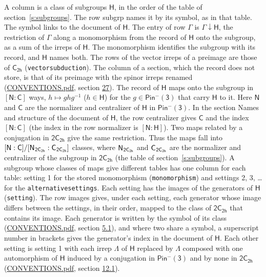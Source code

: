 \documentclass[10pt,a4paper]{article}
\numberwithin{equation}{section}
\newcommand{\grp}[1]{\mathsf{#1}}
\newcommand{\grpindex}[2]{[#1 : #2]}
\newcommand{\restr}[2]{#1\!\downarrow#2}
\newcommand{\hairsp}{\mkern1mu}
\begin{document}
A column is a class of subgroups $\grp{H}$, in the order of the table of section~\ref{s:subgroups}. The row subgrp names it by its symbol, as in that table. The symbol links to the document of $\grp{H}$. The entry of row $\Gamma$ is $\restr{\Gamma}{\grp{H}}$, the restriction of $\Gamma$ along a monomorphism from the record of $\grp{H}$ onto the subgroup, as a sum of the irreps of $\grp{H}$. The monomorphism identifies the subgroup with its record, and $\grp{H}$ names both. The rows of the vector irreps of a preimage are those of \href{../../../rotation/data/pdf/C2h.pdf}{$\grp{C_{2h}}$} (\texttt{vectorsubduction}). The column of a section, which the record does not store, is that of its preimage with the spinor irreps renamed (\href{../../CONVENTIONS.pdf}{CONVENTIONS.pdf}, section \href{../../CONVENTIONS.pdf\#conv.27}{27}). \label{n:group.normalizer.o3}\label{n:group.centralizer.o3}\label{n:element.h}The record of $\grp{H}$ maps onto the subgroup in $\grpindex{\grp{N}}{\grp{C}}$ ways, $h \mapsto g h g^{-1}$ ($h \in \grp{H}$) for the $g \in \grp{Pin^{-}(3)}$ that carry $\grp{H}$ to it. Here $\grp{N}$ and $\grp{C}$ are the normalizer and centralizer of $\grp{H}$ in \href{Pinminus3.pdf}{$\grp{Pin^{-}(3)}$}. In the section Names and structure of the document of $\grp{H}$, the row centralizer gives $\grp{C}$ and the index $\grpindex{\grp{N}}{\grp{C}}$ (the index in the row normalizer is $\grpindex{\grp{N}}{\grp{H}}$). Two maps related by a conjugation in $\grp{2C_{2h}}$ give the same restriction. Thus the maps fall into $\grpindex{\grp{N}}{\grp{C}}/\grpindex{\grp{N}_{\hairsp \grp{2C_{2h}}}}{\grp{C}_{\hairsp \grp{2C_{2h}}}}$ classes, where $\grp{N}_{\hairsp \grp{2C_{2h}}}$ and $\grp{C}_{\hairsp \grp{2C_{2h}}}$ are the normalizer and centralizer of the subgroup in $\grp{2C_{2h}}$ (the table of section~\ref{s:subgroups}). \label{n:head.setting}A subgroup whose classes of maps give different tables has one column for each table: setting 1 for the stored monomorphism (\texttt{monomorphism}) and settings 2, 3, \dots{} for the \texttt{alternativesettings}. Each setting has the images of the generators of $\grp{H}$ (\texttt{setting}). \label{n:head.images}The row images gives, under each setting, each generator whose image differs between the settings, in their order, mapped to the class of $\grp{2C_{2h}}$ that contains its image. Each generator is written by the symbol of its class (\href{../../CONVENTIONS.pdf}{CONVENTIONS.pdf}, section \href{../../../rotation/CONVENTIONS.pdf\#conv.5.1}{5.1}), and where two share a symbol, a superscript number in brackets gives the generator's index in the document of $\grp{H}$. \label{n:irrep.Delta}Each other setting is setting 1 with each irrep $\Lambda$ of $\grp{H}$ replaced by $\Lambda$ composed with one automorphism of $\grp{H}$ induced by a conjugation in \href{Pinminus3.pdf}{$\grp{Pin^{-}(3)}$} and by none in $\grp{2C_{2h}}$ (\href{../../CONVENTIONS.pdf}{CONVENTIONS.pdf}, section \href{../../../rotation/CONVENTIONS.pdf\#conv.12.1}{12.1}).
\end{document}
